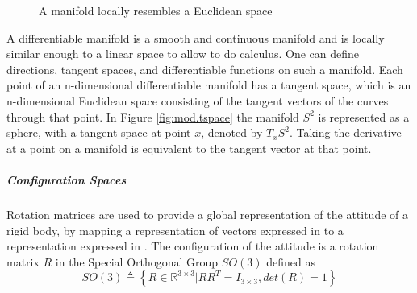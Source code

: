 \begin{figure}[h!]
	\centering
	\caption{A manifold locally resembles a Euclidean space\label{fig:mod.manifold}}
\end{figure}

A differentiable manifold is a smooth and continuous manifold and is locally similar enough to a linear space to allow to do calculus. One can define directions, tangent spaces, and differentiable functions on such a manifold. Each point of an n-dimensional differentiable manifold has a tangent space, which is an n-dimensional Euclidean space consisting of the tangent vectors of the curves through that point. In Figure \ref{fig:mod.tspace} the manifold $ S^2 $ is represented as a sphere, with a tangent space at point $ x $, denoted by $ T_xS^2 $. Taking the derivative at a point on a manifold is equivalent to the tangent vector at that point.
\begin{figure}[h!]
	\centering
	\caption{\label{fig:}}
\end{figure}		

\subparagraph{Configuration Spaces}
Rotation matrices are used to provide a global representation of the attitude of a rigid body, by mapping a representation of vectors expressed in \BF to a representation expressed in \IF \cite{Chaturvedi2011,Murray1994}. 
The configuration of the  attitude is a rotation matrix $ R $ in the Special Orthogonal Group $ SO(3) $ defined as
\begin{equation}\label{key}
SO(3) \triangleq \left\lbrace R\in\mathbb{R}^{3\times3}|RR^T=I_{3\times3}, det(R)=1\right\rbrace 
\end{equation}

